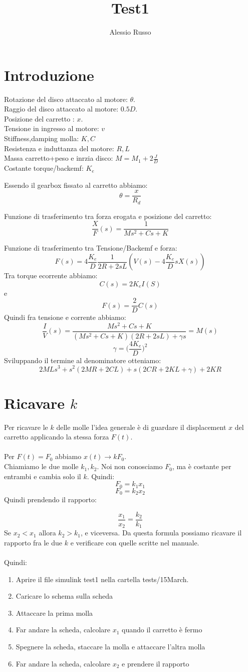 \documentclass[10pt,a4paper]{article}
\author{Alessio Russo}
\title{Test1}
\begin{document}
\tableofcontents

\section{Introduzione}
Rotazione del disco attaccato al motore: $\theta$. \\
Raggio del disco attaccato al motore: $0.5D$. \\
Posizione del carretto : $x$. \\
Tensione in ingresso al motore: $v$ \\
Stiffness,damping molla: $K,C$ \\
Resistenza e induttanza del motore: $R,L$ \\
Massa carretto+peso e inrzia disco: $M=M_1+ 2\frac{J}{D}$ \\
Costante torque/backemf: $K_e$

Essendo il gearbox fissato al carretto abbiamo:
$$\theta= \frac{x}{R_d} $$

Funzione di trasferimento tra forza erogata e posizione del carretto:
$$\frac{X}{F}(s) =  \frac{1}{Ms^2+Cs +K}$$

Funzione di trasferimento tra Tensione/Backemf e forza:
$$F(s) = 4\frac{K_e}{D}\frac{1}{2R+2sL}(V(s)-4\frac{K_e}{D} sX(s))$$
Tra torque ecorrente abbiamo:
$$C(s) = 2K_e I(S)$$
e $$F(s) = \frac{2}{D}C(s)$$
Quindi fra tensione e corrente abbiamo:
$$\frac{I}{V}(s) = \frac{Ms^2+Cs+K}{(Ms^2+Cs+K)(2R+2sL)+\gamma s } =M(s)$$
$$\gamma = \Big(\frac{4K_e}{D}\Big)^2$$
Sviluppando il termine al denominatore otteniamo:
$$2MLs^3 + s^2(2MR+2CL) +s(2CR+2KL+\gamma ) + 2KR$$

\newpage
\section{Ricavare $k$}
Per ricavare le $k$ delle molle l'idea generale è di guardare il displacement $x$ del carretto applicando la stessa forza $F(t)$. \\ \\
Per $F(t)=F_0$ abbiamo $x(t) \to kF_0$. \\
Chiamiamo le due molle $k_1,k_2$. Noi non conosciamo $F_0$, ma è costante per entrambi e cambia solo il $k$. Quindi:
$$F_0 = k_1 x_1$$
$$F_0 = k_2 x_2$$
Quindi prendendo il rapporto:

$$\frac{x_1}{x_2} = \frac{k_2}{k_1}$$
Se $x_2 < x_1$ allora $k_2 > k_1$, e viceversa.  Da questa formula possiamo ricavare il rapporto fra le due $k$ e verificare con quelle scritte nel manuale. \\ \\
Quindi:
\begin{enumerate}
\item Aprire il file simulink test1 nella cartella tests/15March.
\item Caricare lo schema sulla scheda
\item Attaccare la prima molla
\item Far andare la scheda, calcolare $x_1$ quando il carretto è fermo
\item Spegnere la scheda, staccare la molla e attaccare l'altra molla
\item Far andare la scheda, calcolare $x_2$ e prendere il rapporto
\end{enumerate}
\newpage
\end{document}
